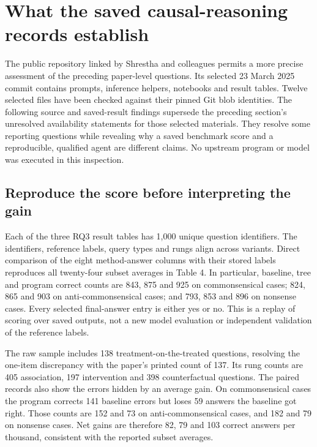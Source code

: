 \section{What the saved causal-reasoning records establish}
\label{exec21:prophetsrepo-scope}
The public repository linked by Shrestha and colleagues permits a more precise
assessment of the preceding paper-level questions. Its selected 23 March 2025
commit contains prompts, inference helpers, notebooks and result tables.
Twelve selected files have been checked against their pinned Git blob identities.
The following source and saved-result findings supersede the preceding section's
unresolved availability statements for those selected materials. They resolve
some reporting questions while revealing why a saved benchmark score and a
reproducible, qualified agent are different claims. No upstream program or
model was executed in this inspection.\citep{exec21_prophets_repo}

\subsection{Reproduce the score before interpreting the gain}
\label{exec21:prophetsrepo-results}
Each of the three RQ3 result tables has 1,000 unique question identifiers. The
identifiers, reference labels, query types and rungs align across variants.
Direct comparison of the eight method-answer columns with their stored labels
reproduces all twenty-four subset averages in Table 4. In particular, baseline,
tree and program correct counts are 843, 875 and 925 on commonsensical cases;
824, 865 and 903 on anti-commonsensical cases; and 793, 853 and 896 on nonsense
cases. Every selected final-answer entry is either yes or no. This is a replay
of scoring over saved outputs, not a new model evaluation or independent
validation of the reference labels.\citep{exec21_prophets_repo,exec21_prophets_repo_reference}

The raw sample includes 138 treatment-on-the-treated questions, resolving the
one-item discrepancy with the paper's printed count of 137. Its rung counts
are 405 association, 197 intervention and 398 counterfactual questions. The
paired records also show the errors hidden by an average gain. On commonsensical
cases the program corrects 141 baseline errors but loses 59 answers the baseline
got right. Those counts are 152 and 73 on anti-commonsensical cases, and 182 and
79 on nonsense cases. Net gains are therefore 82, 79 and 103 correct answers
per thousand, consistent with the reported subset averages.
\citep{exec21_prophets_repo_reference}

